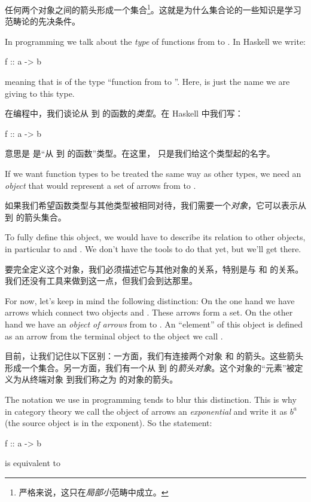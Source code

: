 \documentclass[DaoFP]{subfiles}
\begin{document}
 任何两个对象之间的箭头形成一个集合\footnote{严格来说，这只在\emph{局部小}范畴中成立。}。这就是为什么集合论的一些知识是学习范畴论的先决条件。

 In programming we talk about the \emph{type} of functions from  to . In Haskell we write:
 \begin{haskell}
  f :: a -> b
 \end{haskell}
 meaning that  is of the type ``function from  to ''. Here,  is just the name we are giving to this type.

 在编程中，我们谈论从  到  的函数的\emph{类型}。在 Haskell 中我们写：
 \begin{haskell}
  f :: a -> b
 \end{haskell}
 意思是  是``从  到  的函数''类型。在这里， 只是我们给这个类型起的名字。

 If we want function types to be treated the same way as other types, we need an \emph{object} that would represent a set of arrows from  to .

 如果我们希望函数类型与其他类型被相同对待，我们需要一个\emph{对象}，它可以表示从  到  的箭头集合。

 To fully define this object, we would have to describe its relation to other objects, in particular to  and . We don't have the tools to do that yet, but we'll get there.

 要完全定义这个对象，我们必须描述它与其他对象的关系，特别是与  和  的关系。我们还没有工具来做到这一点，但我们会到达那里。

 For now, let's keep in mind the following distinction: On the one hand we have arrows which connect two objects  and . These arrows form a set. On the other hand we have an \emph{object of arrows} from   to . An ``element'' of this object is defined as an arrow from the terminal object \hask{()} to the object we call .

 目前，让我们记住以下区别：一方面，我们有连接两个对象  和  的箭头。这些箭头形成一个集合。另一方面，我们有一个从  到  的\emph{箭头对象}。这个对象的``元素''被定义为从终端对象 \hask{()} 到我们称之为  的对象的箭头。

 The notation we use in programming tends to blur this distinction. This is why in category theory we call the object of arrows an \emph{exponential} and write it as $ b^a$ (the source object is in the exponent). So the statement:
 \begin{haskell}
  f :: a -> b
 \end{haskell}
 is equivalent to
\end{document}
